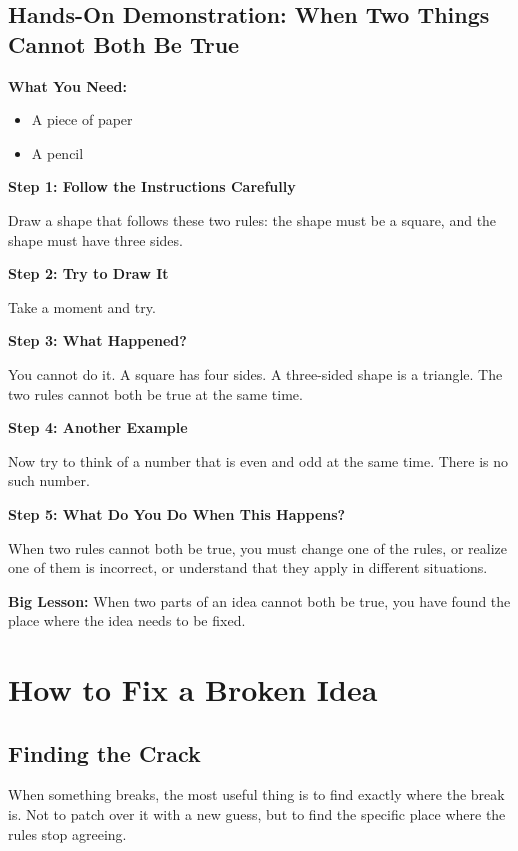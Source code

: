 \documentclass[12pt]{book}
\begin{document}
\section*{Hands-On Demonstration: When Two Things Cannot Both Be True}

\textbf{What You Need:}
\begin{itemize}
  \item A piece of paper
  \item A pencil
\end{itemize}

\textbf{Step 1: Follow the Instructions Carefully}

Draw a shape that follows these two rules: the shape must be a square, and
the shape must have three sides.

\textbf{Step 2: Try to Draw It}

Take a moment and try.

\textbf{Step 3: What Happened?}

You cannot do it. A square has four sides. A three-sided shape is a
triangle. The two rules cannot both be true at the same time.

\textbf{Step 4: Another Example}

Now try to think of a number that is even and odd at the same time. There
is no such number.

\textbf{Step 5: What Do You Do When This Happens?}

When two rules cannot both be true, you must change one of the rules, or
realize one of them is incorrect, or understand that they apply in
different situations.

\textbf{Big Lesson:} When two parts of an idea cannot both be true, you
have found the place where the idea needs to be fixed.

\chapter{How to Fix a Broken Idea}

\section{Finding the Crack}

When something breaks, the most useful thing is to find exactly where the
break is. Not to patch over it with a new guess, but to find the specific
place where the rules stop agreeing.
\end{document}
